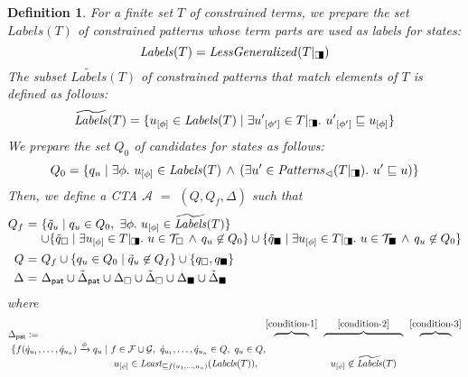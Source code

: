 \documentclass[copyright,creativecommons]{eptcs}
\newtheorem{definition}{Definition}
\newcommand{\cA}{\mathcal{A}}
\newcommand{\cF}{\mathcal{F}}
\newcommand{\cG}{\mathcal{G}}
\newcommand{\Terms}{{\mathcal{T}}}
\newcommand{\TwC}[2]{{#1}_{[#2]}}
\newcommand{\Bothsquares}{\scalebox{.5}[.8]{$\square\!\blacksquare$}}
\newcommand{\Replace}[1]{{#1}|_{\Bothsquares}}
\newcommand{\Subpatterns}{{\mathit{Patterns}_{\lhd}}}
\newcommand{\Inst}{{\mathit{LessGeneralized}}}
\newcommand{\Maximal}[1][]{{\mathit{Least}_{\sqsubseteq #1}}}
\newcommand{\Labels}{{\mathit{Labels}}}
\newcommand{\Initials}{\widetilde{\Labels}}
\begin{document}
\begin{definition}
 \label{def:G(T)}
 For a finite set $T$ of constrained terms, 
 we prepare the set $\Labels(T)$ of constrained patterns whose term parts
 are used as labels for states:
 \[
 \Labels(T) = \Inst(\Replace{T})
 \]
 The subset $\Initials(T)$ of constrained patterns that match
 elements of $T$ 
 is defined as follows:
 \[
 \Initials(T) = \{
 \TwC{u}{\phi} \in \Labels(T) \mid
 \exists \TwC{u'}{\phi'} \in \Replace{T}.\
 \TwC{u'}{\phi'} \sqsubseteq \TwC{u}{\phi}
 \}
 \]
We prepare the set $Q_0$ of candidates for states as follows:
\[
 Q_0 = \{ q_u \mid \exists \phi.\ 
 \TwC{u}{\phi} \in \Labels(T)
 \,\wedge\,
  (\exists u' \in \Subpatterns(\Replace{T}).\ 
  u' \sqsubseteq u
  )
 \}
\]
 Then, we define a CTA $\cA$ $=$ $(Q,Q_f,\Delta)$ such that
\[
 \begin{array}{@{}r@{~}r@{~}l@{}}
  Q_f & = & \{ \tilde{q}_u \mid 
   q_u \in Q_0,
   ~
   \exists \phi.\ \TwC{u}{\phi} \in \Initials(T)
   \}
   \\
  & & \cup
   \{ \tilde{q}_\square \mid 
   \exists \TwC{u}{\phi} \in
   \Replace{T}.\ 
   u \in \Terms_\square 
   \,\wedge\,
   q_u \not\in Q_0
\} 
   \cup
   \{ \tilde{q}_\blacksquare \mid 
   \exists \TwC{u}{\phi} \in
   \Replace{T}.\ 
   u \in \Terms_\blacksquare 
   \,\wedge\,
   q_u \not\in Q_0
\} 
   \\[5pt]
  Q & = & 
  Q_f 
  \cup
  \{ q_u \in Q_0 \mid \tilde{q}_u \not\in Q_f \}
  \cup 
  \{ q_\square, q_\blacksquare\}
  \\[3pt]
  \Delta & = & \Delta_{\mathsf{pat}} \cup \tilde{\Delta}_{\mathsf{pat}} 
  \cup \Delta_\square \cup \tilde{\Delta}_\square
  \cup \Delta_\blacksquare \cup \tilde{\Delta}_\blacksquare
 \end{array}
\]
where
\[
 \begin{array}{@{}l@{~}l@{~}l@{~}l@{~}c@{~}c@{~}c@{~}c@{~}c@{}r@{}}
\multicolumn{2}{@{}l@{}}{\Delta_{\mathsf{pat}} := }
  & & &
   \overbrace{~~~~~~~~~~~}^{\mbox{\rm \ref{condition-1}}} & &
   \overbrace{~~~~~~~~~~~~~~~~~~~~~~~~~}^{\mbox{\rm \ref{condition-2}}} & & 
   \overbrace{~~~~~~~~~~}^{\mbox{\rm \ref{condition-3}}} 
   \\
  &
   \{ f(\dot{q}_{u_1},\ldots,\dot{q}_{u_n}) \xrightarrow[]{\phi} q_u
   \mid &
   \multicolumn{2}{@{}l@{}}{
   f \in \cF\cup\cG,
   ~
   \dot{q}_{u_1},\ldots,\dot{q}_{u_n} \in Q, 
   ~
   q_u \in Q,
   }
   \\
  & &
   & \TwC{u}{\phi} \in
   \Maximal[f(u_1,\ldots,u_n)](\Labels(T)),
   &
&  & 
   \TwC{u}{\phi} \not\in \Initials(T) 
   & & 

\end{array}\]
\end{definition}
\end{document}
